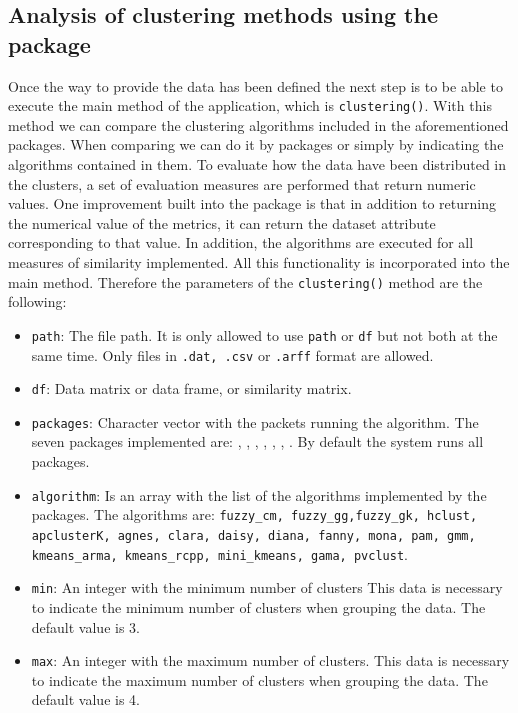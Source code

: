\subsection {Analysis of clustering methods using the  package}

Once the way to provide the data has been defined the next step is to be able to execute the main method of the application, which is \texttt{clustering()}. With this method we can compare the clustering algorithms included in the aforementioned packages. When comparing we can do it by packages or simply by indicating the algorithms contained in them. To evaluate how the data have been distributed in the clusters, a set of evaluation measures are performed that return numeric values. One improvement built into the package is that in addition to returning the numerical value of the metrics, it can return the dataset attribute corresponding to that value. In addition, the algorithms are executed for all measures of similarity implemented. All this functionality is incorporated into the main method. Therefore the parameters of the \texttt{clustering()} method are the following:
\begin{itemize}
  \item \texttt{path}: The file path. It is only allowed to use \texttt{path} or \texttt{df} but not both at the same time. Only files in \texttt{.dat, .csv} or \texttt{.arff} format are allowed.
  \item \texttt{df}: Data matrix or data frame, or similarity matrix.
  \item \texttt{packages}: Character vector with the packets running the algorithm. The seven packages implemented are: , , , , , , . By default the system runs all packages.
  \item \texttt{algorithm}: Is an array with the list of the algorithms implemented by the packages. The algorithms are: \texttt{fuzzy\_cm, fuzzy\_gg,fuzzy\_gk, hclust, apclusterK, agnes, clara, daisy, diana, fanny, mona, pam, gmm, kmeans\_arma, kmeans\_rcpp, mini\_kmeans, gama, pvclust}.
  \item \texttt{min}: An integer with the minimum number of clusters This data is necessary to indicate the minimum number of clusters when grouping the data. The default value is 3.
  \item \texttt{max}: An integer with the maximum number of clusters. This data is necessary to indicate the maximum number of clusters when grouping the data. The default value is 4.
\end{itemize}
